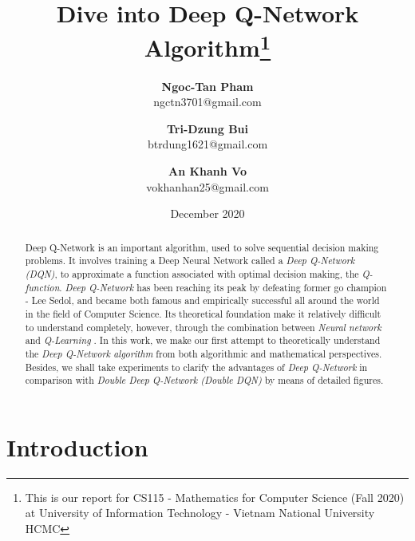 \documentclass{article}
\title{\textbf{Dive into Deep Q-Network Algorithm\footnote[1]{This is our report for CS115 - Mathematics for Computer Science (Fall 2020) at University of Information Technology - Vietnam National University HCMC}}}
\author{
  \textbf{Ngoc-Tan Pham\footnotemark[2]}\\
  \small ngctn3701@gmail.com
  \and
  \textbf{Tri-Dzung Bui\footnotemark[2]}\\
   \small btrdung1621@gmail.com
  \and
  \textbf{An Khanh Vo\footnotemark[2]}\\
  \small vokhanhan25@gmail.com
  \footnotetext{Faculty of Computer Science, University of Information Technology, Vietnam National University HCMC}}
\date{December 2020}
\begin{document}
\maketitle

\begin{abstract}
\justifying 
\noindent 
    Deep Q-Network is an important algorithm, used to solve sequential decision making problems. It involves training a Deep Neural Network called a \textit{Deep Q-Network (DQN)}, to approximate a function associated with optimal decision making, the \textit{Q-function}. \textit{Deep Q-Network} has been reaching its peak by defeating former go champion - Lee Sedol, and became both famous and empirically successful all around the world in the field of Computer Science. Its theoretical foundation make it relatively difficult to understand completely, however, through the combination between \textit{Neural network} \cite{NeuralNetwork} and \textit{Q-Learning} \cite{QLearning}. In this work, we make our first attempt to theoretically understand the \textit{Deep Q-Network algorithm} \cite{ZDeepQLearn} from both algorithmic and mathematical perspectives. Besides, we shall take experiments to clarify the advantages of \textit{Deep Q-Network} in comparison with \textit{Double Deep Q-Network (Double DQN)} by means of detailed figures.
\end{abstract}


\section{Introduction}
\end{document}
